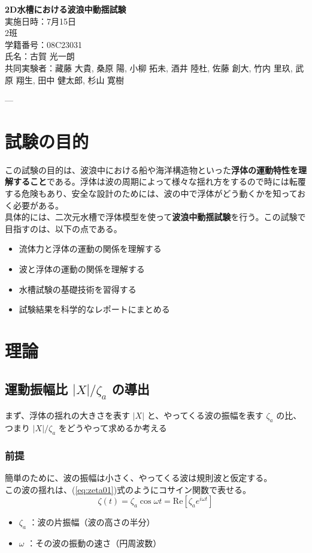 \documentclass[dvipdfmx,a4paper]{jreport} %
\def\titlepage{%
\thispagestyle{empty}%
\begin{center}%
    \vspace*{\fill}%
    {\huge \bfseries 2D水槽における波浪中動揺試験 \\}%
    \vspace{2cm}%
    {\large 実施日時：7月15日\\}%
    \vspace{1cm}%
    {\large 2班\\}%
    \vspace{1cm}%
    {\large 学籍番号：08C23031\\}%
    \vspace{1cm}%
    {\large 氏名：古賀 光一朗 \\}%
    \vspace*{1cm}%
    {\large 共同実験者：藏藤 大貴, 桑原 陽, 小柳 拓未, 酒井 陸杜, 佐藤 創大, 竹内 里玖, 武原 翔生, 田中 健太郎, 杉山 寛樹}
    \vspace{\fill}
\end{center}%
}
\begin{document}
\titlepage

---

\chapter{試験の目的}
この試験の目的は、波浪中における船や海洋構造物といった\textbf{浮体の運動特性を理解すること}である。浮体は波の周期によって様々な揺れ方をするので時には転覆する危険もあり、安全な設計のためには、波の中で浮体がどう動くかを知っておく必要がある。\\
具体的には、二次元水槽で浮体模型を使って\textbf{波浪中動揺試験}を行う。この試験で目指すのは、以下の点である。
\begin{itemize}
    \item 流体力と浮体の運動の関係を理解する
    \item 波と浮体の運動の関係を理解する
    \item 水槽試験の基礎技術を習得する
    \item 試験結果を科学的なレポートにまとめる
\end{itemize}

\chapter{理論}
\section{運動振幅比 $|X|/\zeta_a$ の導出}

まず、浮体の揺れの大きさを表す $|X|$ と、やってくる波の振幅を表す $\zeta_a$ の比、つまり $|X|/\zeta_a$ をどうやって求めるか考える

\subsection{前提}
    簡単のために、波の振幅は小さく、やってくる波は規則波と仮定する。\\この波の揺れは、(\ref{eq:zeta01})式のようにコサイン関数で表せる。
    \begin{equation}
    \label{eq:zeta01}
        \zeta (t) = \zeta_a \cos \omega t = \text{Re}[\zeta_a e^{i\omega t}]
    \end{equation}
    \begin{itemize}
        \item $\zeta_a$ ：波の片振幅（波の高さの半分）
        \item $\omega$ ：その波の振動の速さ（円周波数）
    \end{itemize}
\end{document}
